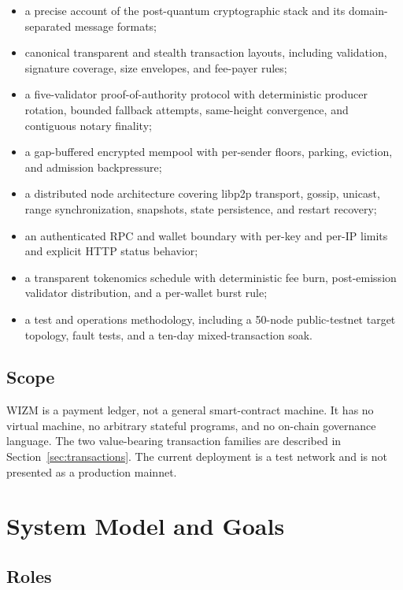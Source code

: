 \documentclass[11pt,a4paper]{article}
\begin{document}
\begin{itemize}[leftmargin=*]
  \item a precise account of the post-quantum cryptographic stack and its
        domain-separated message formats;
  \item canonical transparent and stealth transaction layouts, including
        validation, signature coverage, size envelopes, and fee-payer rules;
  \item a five-validator proof-of-authority protocol with deterministic
        producer rotation, bounded fallback attempts, same-height convergence,
        and contiguous notary finality;
  \item a gap-buffered encrypted mempool with per-sender floors, parking,
        eviction, and admission backpressure;
  \item a distributed node architecture covering libp2p transport, gossip,
        unicast, range synchronization, snapshots, state persistence, and
        restart recovery;
  \item an authenticated RPC and wallet boundary with per-key and per-IP
        limits and explicit HTTP status behavior;
  \item a transparent tokenomics schedule with deterministic fee burn,
        post-emission validator distribution, and a per-wallet burst rule;
  \item a test and operations methodology, including a 50-node public-testnet
        target topology, fault tests, and a ten-day mixed-transaction soak.
\end{itemize}

\subsection{Scope}

WIZM is a payment ledger, not a general smart-contract machine. It has no
virtual machine, no arbitrary stateful programs, and no on-chain governance
language. The two value-bearing transaction families are described in
Section~\ref{sec:transactions}. The current deployment is a test network and
is not presented as a production mainnet.

\section{System Model and Goals}

\subsection{Roles}
\end{document}
